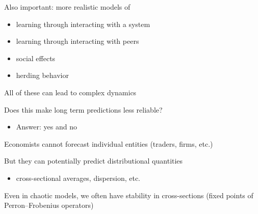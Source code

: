 \documentclass[
    xcolor={svgnames,dvipsnames},
    hyperref={colorlinks, citecolor=DeepPink4, linkcolor=DarkRed, urlcolor=DarkBlue}
    ]{beamer}  %
\newcommand{\1}{\mathbbm 1}
\begin{document}
\begin{frame}
    
    Also important:  more realistic models of
            \vspace{0.3em}

    \begin{itemize}
        \item learning through interacting with a system
            \vspace{0.3em}
        \item learning through interacting with peers
            \vspace{0.3em}
        \item social effects
            \vspace{0.3em}
        \item herding behavior
    \end{itemize}

            \vspace{0.3em}
            \vspace{0.3em}
            \vspace{0.3em}
            \vspace{0.3em}

    All of these can lead to complex dynamics

\end{frame}


\begin{frame}
    
    Does this make long term predictions less reliable?

            \vspace{0.3em}
    \begin{itemize}
        \item Answer: yes and no
    \end{itemize}

            \vspace{0.3em}
    Economists cannot forecast individual entities (traders,
    firms, etc.)

            \vspace{0.3em}
            \vspace{0.3em}
    But they can potentially predict distributional quantities

    \begin{itemize}
        \item cross-sectional averages, dispersion, etc.
    \end{itemize}

            \vspace{0.3em}
            \vspace{0.3em}
            \vspace{0.3em}
    Even in chaotic models, we often have stability in cross-sections
    (fixed points of Perron--Frobenius operators)

\end{frame}
\end{document}
